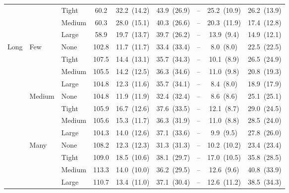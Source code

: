 \begin{table}[htbp]
{\begin{tabular}{lll c ccccc}
 &  & {\small Tight} & 60.2 & 32.2~{\scriptsize(14.2)} & 43.9~{\scriptsize(26.9)} & -- & 25.2~{\scriptsize(10.9)} & 26.2~{\scriptsize(13.9)} \\
 &  & {\small Medium} & 60.3 & 28.0~{\scriptsize(15.1)} & 40.3~{\scriptsize(26.6)} & -- & 20.3~{\scriptsize(11.9)} & 17.4~{\scriptsize(12.8)} \\
 &  & {\small Large} & 58.9 & 19.7~{\scriptsize(13.7)} & 39.7~{\scriptsize(26.2)} & -- & 13.9~{\scriptsize(9.4)} & 14.9~{\scriptsize(12.1)} \\
\midrule
\multirow{12}{*}{\small Long} & \multirow{4}{*}{\small Few} & {\small None} & 102.8 & 11.7~{\scriptsize(11.7)} & 33.4~{\scriptsize(33.4)} & -- & 8.0~{\scriptsize(8.0)} & 22.5~{\scriptsize(22.5)} \\
 &  & {\small Tight} & 107.5 & 14.4~{\scriptsize(13.1)} & 35.7~{\scriptsize(34.3)} & -- & 10.1~{\scriptsize(8.9)} & 26.5~{\scriptsize(24.9)} \\
 &  & {\small Medium} & 105.5 & 14.2~{\scriptsize(12.5)} & 36.3~{\scriptsize(34.6)} & -- & 11.0~{\scriptsize(9.8)} & 20.8~{\scriptsize(19.3)} \\
 &  & {\small Large} & 104.8 & 12.3~{\scriptsize(11.6)} & 35.7~{\scriptsize(34.1)} & -- & 8.4~{\scriptsize(8.0)} & 18.9~{\scriptsize(17.9)} \\
 & \multirow{4}{*}{\small Medium} & {\small None} & 104.8 & 11.9~{\scriptsize(11.9)} & 32.4~{\scriptsize(32.4)} & -- & 8.6~{\scriptsize(8.6)} & 25.1~{\scriptsize(25.1)} \\
 &  & {\small Tight} & 105.9 & 16.7~{\scriptsize(12.6)} & 37.6~{\scriptsize(33.5)} & -- & 12.1~{\scriptsize(8.7)} & 29.0~{\scriptsize(24.5)} \\
 &  & {\small Medium} & 105.6 & 15.3~{\scriptsize(11.7)} & 36.3~{\scriptsize(31.9)} & -- & 11.0~{\scriptsize(8.8)} & 28.5~{\scriptsize(24.0)} \\
 &  & {\small Large} & 104.3 & 14.0~{\scriptsize(12.6)} & 37.1~{\scriptsize(33.6)} & -- & 9.9~{\scriptsize(9.5)} & 27.8~{\scriptsize(26.0)} \\
 & \multirow{4}{*}{\small Many} & {\small None} & 108.2 & 12.3~{\scriptsize(12.3)} & 31.3~{\scriptsize(31.3)} & -- & 10.2~{\scriptsize(10.2)} & 23.4~{\scriptsize(23.4)} \\
 &  & {\small Tight} & 109.0 & 18.5~{\scriptsize(10.6)} & 38.1~{\scriptsize(29.7)} & -- & 17.0~{\scriptsize(10.5)} & 35.8~{\scriptsize(28.5)} \\
 &  & {\small Medium} & 113.3 & 14.0~{\scriptsize(10.0)} & 36.2~{\scriptsize(29.5)} & -- & 12.6~{\scriptsize(9.6)} & 40.8~{\scriptsize(33.9)} \\
 &  & {\small Large} & 110.7 & 13.4~{\scriptsize(11.0)} & 37.1~{\scriptsize(30.4)} & -- & 12.6~{\scriptsize(11.2)} & 38.5~{\scriptsize(34.3)} \\
\bottomrule
\end{tabular}%
}
\end{table}
